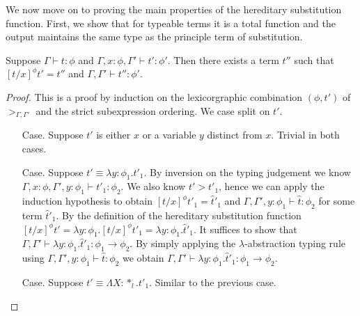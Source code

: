 We now move on to proving the main properties of the hereditary
substitution function.  First, we show that for typeable terms it is a
total function and the output maintains the same type as the principle
term of substitution.
\begin{lemma}
  \label{lemma:total_ssfp}
  Suppose $\Gamma \vdash t : \phi$ and $\Gamma, x:\phi, \Gamma' \vdash t':\phi'$. Then
  there exists a term $t''$ such that $[t/x]^\phi t' = t''$ and 
  $\Gamma,\Gamma' \vdash t'':\phi'$.
\end{lemma}
\begin{proof}
  This is a proof by induction on the lexicorgraphic combination
  $(\phi, t')$ of $>_{\Gamma,\Gamma'}$ and the strict subexpression
  ordering.  We case split on $t'$.

\begin{itemize}
\item[Case.] Suppose $t'$ is either $x$ or a variable $y$ distinct from $x$.  
  Trivial in both cases.
  
\item[Case.] Suppose $t' \equiv \lambda y:\phi_1.t'_1$.  By inversion on the
  typing judgement we know $\Gamma,x:\phi,\Gamma',y:\phi_1 \vdash t'_1:\phi_2$.
  We also know $t' > t'_1$, hence we can apply the induction hypothesis to obtain
  $[t/x]^\phi t'_1 = \hat{t}'_1$ and $\Gamma,\Gamma',y:\phi_1 \vdash \hat{t}:\phi_2$
  for some term $\hat{t}'_1$.  By the definition of the hereditary substitution function 
  $[t/x]^\phi t' = \lambda y:\phi_1.[t/x]^\phi t'_1 = \lambda y:\phi_1.\hat{t}'_1$.  It suffices
  to show that $\Gamma,\Gamma' \vdash \lambda y:\phi_1.\hat{t}'_1:\phi_1 \to \phi_2$.  
  By simply applying the $\lambda$-abstraction typing rule using
  $\Gamma,\Gamma',y:\phi_1 \vdash \hat{t}:\phi_2$ we obtain 
  $\Gamma,\Gamma' \vdash \lambda y:\phi_1.\hat{t}'_1:\phi_1 \to \phi_2$.
  
\item[Case.] Suppose $t' \equiv \Lambda X:*_l.t'_1$.  Similar to the previous case.
  

\end{itemize}
\end{proof}
